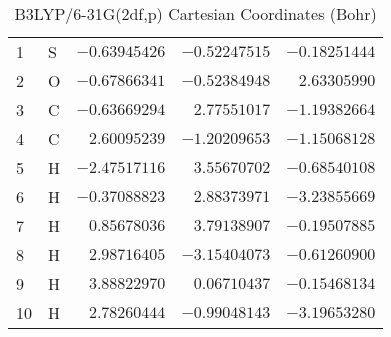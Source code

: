 \documentclass[10pt,oneside]{article}
\begin{document}
\begin{table}[h!]
\centering
\caption{B3LYP/6-31G(2df,p) Cartesian Coordinates (Bohr)}
\begin{tabular}{llrrr}
1  & S  & $-0.63945426$ & $-0.52247515$ & $-0.18251444$ \\
2  & O  & $-0.67866341$ & $-0.52384948$ & $ 2.63305990$ \\
3  & C  & $-0.63669294$ & $ 2.77551017$ & $-1.19382664$ \\
4  & C  & $ 2.60095239$ & $-1.20209653$ & $-1.15068128$ \\
5  & H  & $-2.47517116$ & $ 3.55670702$ & $-0.68540108$ \\
6  & H  & $-0.37088823$ & $ 2.88373971$ & $-3.23855669$ \\
7  & H  & $ 0.85678036$ & $ 3.79138907$ & $-0.19507885$ \\
8  & H  & $ 2.98716405$ & $-3.15404073$ & $-0.61260900$ \\
9  & H  & $ 3.88822970$ & $ 0.06710437$ & $-0.15468134$ \\
10 & H  & $ 2.78260444$ & $-0.99048143$ & $-3.19653280$ \\
\end{tabular}
\end{table}

\clearpage
\end{document}
